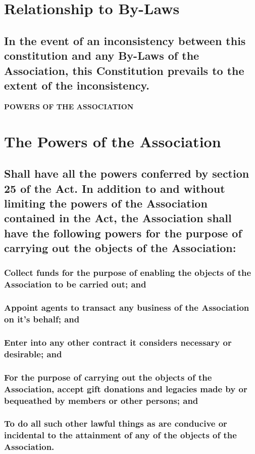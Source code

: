 \documentclass{article}
\newenvironment{subs}
  {\adjustwidth{2em}{0pt}}
  {\endadjustwidth}
\begin{document}
\section{Relationship to By-Laws}
\begin{subs}
\subsection{In the event of an inconsistency between this constitution and any By-Laws of the Association, this Constitution prevails to the extent of the inconsistency.}
\end{subs}
\newpage

{\large\bf POWERS OF THE ASSOCIATION\par}
\hrulefill

\section{The Powers of the Association}
\begin{subs}
\subsection{Shall have all the powers conferred by section 25 of the Act. In addition to and without limiting the powers of the Association contained in the Act, the Association shall have the following powers for the purpose of carrying out the objects of the Association:}
\begin{subs}
\subsubsection{Collect funds for the purpose of enabling the objects of the Association to be carried out; and}
\subsubsection{Appoint agents to transact any business of the Association on it's behalf; and}
\subsubsection{Enter into any other contract it considers necessary or desirable; and}
\subsubsection{For the purpose of carrying out the objects of the Association, accept gift donations and legacies made by or bequeathed by members or other persons; and}
\subsubsection{To do all such other lawful things as are conducive or incidental to the attainment of any of the objects of the Association.}
\end{subs}
\end{subs}
\end{document}
